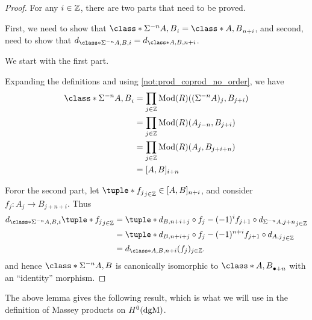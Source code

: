 \begin{proof}
    For any \( i \in {\mathbb{Z}} \), there are two parts that need to be proved.

    First, we need to show that \( \class*{\Sigma^{-n} A, B}_i = \class*{A, B}_{n + i} \), and second, need to show that \( d_{\class*{\Sigma^{-n} A, B}, i} = d_{\class*{A, B}, n + i} \).

    We start with the first part.

    Expanding the definitions and using \autoref{not:prod_coprod_no_order}, we have
    \begin{align*}
        \class*{\Sigma^{-n} A, B}_i &= \prod_{j \in \Zb} \Mod(R)((\Sigma^{-n} A)_j, B_{j + i}) \\
        &= \prod_{j \in \Zb} \Mod(R)(A_{j - n}, B_{j + i}) \\
        &= \prod_{j \in \Zb} \Mod(R)(A_j, B_{j + i + n}) \\
        &= [A, B]_{i + n}
    \end{align*}

    Foror the second part, let \( \tuple*{f_j}_{j \in \Zb} \in [A, B]_{n + i} \), and consider \( f_j: A_j \to B_{j + n + i} \). Thus
    \begin{align*}
        d_{\class*{\Sigma^{-n} A, B}, i}\tuple*{f_j}_{j \in \Zb} &= \tuple*{d_{B, n + i + j} \circ f_j - (-1)^i f_{j + 1} \circ d_{\Sigma^{-n} A, j + n}}_{j \in \Zb} \\
        &= \tuple*{d_{B, n + i + j} \circ f_j - (-1)^{n + i} f_{j + 1} \circ d_{A, j}}_{j \in \Zb} \\
        &= d_{\class*{A, B}, n + i}(f_j)_{j \in \Zb}.
    \end{align*}
    and hence \( \class*{\Sigma^{-n} A, B} \) is canonically isomorphic to \( \class*{A, B}_{\bullet+n} \) with an ``identity'' morphism.
\end{proof}

The above lemma gives the following result, which is what we will use in the definition of Massey products on \( H^0(\operatorname{dgM}) \).

